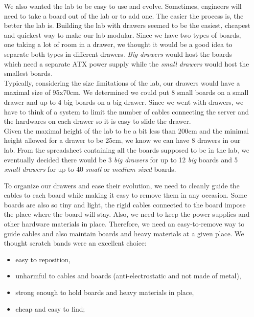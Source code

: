 We also wanted the lab to be easy to use and evolve. Sometimes, engineers will need to take a board out of the lab or to add one. The easier the process is, the better the lab is. Building the lab with drawers seemed to be the easiest, cheapest and quickest way to make our lab modular. Since we have two types of boards, one taking a lot of room in a drawer, we thought it would be a good idea to separate both types in different drawers. \textit{Big drawers} would host the boards which need a separate ATX power supply while the \textit{small drawers} would host the smallest boards.\\
Typically, considering the size limitations of the lab, our drawers would have a maximal size of 95x70cm. We determined we could put 8 small boards on a small drawer and up to 4 big boards on a big drawer. Since we went with drawers, we have to think of a system to limit the number of cables connecting the server and the hardwares on each drawer so it is easy to slide the drawer.\\
Given the maximal height of the lab to be a bit less than 200cm and the minimal height allowed for a drawer to be 25cm, we know we can have 8 drawers in our lab. From the spreadsheet containing all the boards supposed to be in the lab, we eventually decided there would be 3 \textit{big drawers} for up to 12 \textit{big} boards and 5 \textit{small drawers} for up to 40 \textit{small} or \textit{medium-sized} boards.

To organize our drawers and ease their evolution, we need to cleanly guide the cables to each board while making it easy to remove them in any occasion. Some boards are also so tiny and light, the rigid cables connected to the board impose the place where the board will stay. Also, we need to keep the power supplies and other hardware materials in place. Therefore, we need an easy-to-remove way to guide cables and also maintain boards and heavy materials at a given place. We thought scratch bands were an excellent choice:

\begin{itemize}
  \item easy to reposition,
  \item unharmful to cables and boards (anti-electrostatic and not made of metal),
  \item strong enough to hold boards and heavy materials in place,
  \item cheap and easy to find;
\end{itemize}

